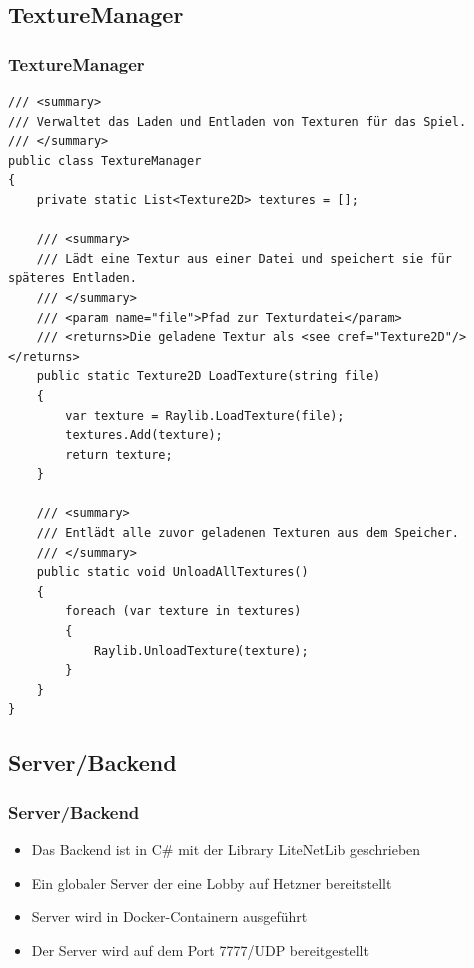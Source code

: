 \documentclass{beamer}
\begin{document}
\subsection{TextureManager}
\begin{frame}[fragile]
\frametitle{TextureManager}
\begin{lstlisting}[language=CSharp, basicstyle=\ttfamily\tiny, breaklines=true]
/// <summary>
/// Verwaltet das Laden und Entladen von Texturen für das Spiel.
/// </summary>
public class TextureManager
{
    private static List<Texture2D> textures = [];

    /// <summary>
    /// Lädt eine Textur aus einer Datei und speichert sie für späteres Entladen.
    /// </summary>
    /// <param name="file">Pfad zur Texturdatei</param>
    /// <returns>Die geladene Textur als <see cref="Texture2D"/></returns>
    public static Texture2D LoadTexture(string file)
    {
        var texture = Raylib.LoadTexture(file);
        textures.Add(texture);
        return texture;
    }

    /// <summary>
    /// Entlädt alle zuvor geladenen Texturen aus dem Speicher.
    /// </summary>
    public static void UnloadAllTextures()
    {
        foreach (var texture in textures)
        {
            Raylib.UnloadTexture(texture);
        }
    }
}
\end{lstlisting}
\end{frame}

\subsection{Server/Backend}
\begin{frame}
\frametitle{Server/Backend}
  \begin{itemize}
    \item Das Backend ist in C\# mit der Library LiteNetLib geschrieben
    \item Ein globaler Server der eine Lobby auf Hetzner bereitstellt
    \item Server wird in Docker-Containern ausgeführt
    \item Der Server wird auf dem Port 7777/UDP bereitgestellt
  \end{itemize}
\end{frame}
\end{document}
